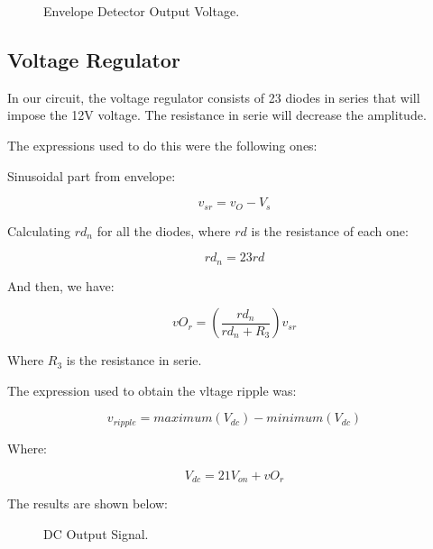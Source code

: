\begin{figure}[H] \centering
\caption{Envelope Detector Output Voltage.}
\label{fig:envelopeth}
\end{figure}

\subsection{Voltage Regulator}
In our circuit, the voltage regulator consists of 23 diodes in series that will impose the 12V voltage. The resistance in serie will decrease the amplitude.\par
The expressions used to do this were the following ones:\par
Sinusoidal part from envelope:\par
\begin{equation}
    v_{sr} = v_O - V_s
\end{equation}\par
Calculating $rd_{n}$ for all the diodes, where $rd$ is the resistance of each one:\par
\begin{equation}
    rd_n = 23rd
\end{equation}\par
And then, we have: \par
\begin{equation}
    vO_r = (\frac{rd_n}{rd_n + R_3})v_{sr}
\end{equation}\par
Where $R_3$ is the resistance in serie.\par
The expression used to obtain the vltage ripple was: \par
\begin{equation}
    v_{ripple} = maximum(V_{dc})-minimum(V_{dc})
\end{equation}\par
Where: \par
\begin{equation}
    V_{dc} = 21V_{on} + vO_r
\end{equation}\par
The results are shown below:\par

\begin{figure}[H] \centering
\caption{DC Output Signal.}
\label{fig:outputdc}
\end{figure}

